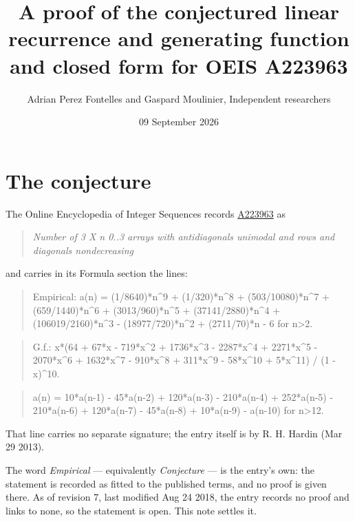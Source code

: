 \documentclass[11pt]{article}
\title{A proof of the conjectured linear recurrence and generating function and closed form for OEIS A223963}
\author{Adrian Perez Fontelles and Gaspard Moulinier, Independent researchers}
\date{09 September 2026}
\theoremstyle{definition}
\begin{document}
\maketitle
\section{The conjecture}

The Online Encyclopedia of Integer Sequences records \href{https://oeis.org/A223963}{A223963} as

\begin{quote}\itshape Number of 3 X n 0..3 arrays with antidiagonals unimodal and rows and diagonals nondecreasing\end{quote}

and carries in its Formula section the lines:

\begin{quote}\ttfamily Empirical: a(n) = (1/8640)*n\textasciicircum{}9 + (1/320)*n\textasciicircum{}8 + (503/10080)*n\textasciicircum{}7 + (659/1440)*n\textasciicircum{}6 + (3013/960)*n\textasciicircum{}5 + (37141/2880)*n\textasciicircum{}4 + (106019/2160)*n\textasciicircum{}3 - (18977/720)*n\textasciicircum{}2 + (2711/70)*n - 6 for n>2.\end{quote}

\begin{quote}\ttfamily G.f.: x*(64 + 67*x - 719*x\textasciicircum{}2 + 1736*x\textasciicircum{}3 - 2287*x\textasciicircum{}4 + 2271*x\textasciicircum{}5 - 2070*x\textasciicircum{}6 + 1632*x\textasciicircum{}7 - 910*x\textasciicircum{}8 + 311*x\textasciicircum{}9 - 58*x\textasciicircum{}10 + 5*x\textasciicircum{}11) / (1 - x)\textasciicircum{}10.\end{quote}

\begin{quote}\ttfamily a(n) = 10*a(n-1) - 45*a(n-2) + 120*a(n-3) - 210*a(n-4) + 252*a(n-5) - 210*a(n-6) + 120*a(n-7) - 45*a(n-8) + 10*a(n-9) - a(n-10) for n>12.\end{quote}

That line carries no separate signature; the entry itself is by R. H. Hardin (Mar 29 2013).

The word {\itshape Empirical} --- equivalently {\itshape Conjecture} --- is the entry's own: the statement is recorded as fitted to the published terms, and no proof is given there. As of revision 7, last modified Aug 24 2018, the entry records no proof and links to none, so the statement is open. This note settles it.
\end{document}
